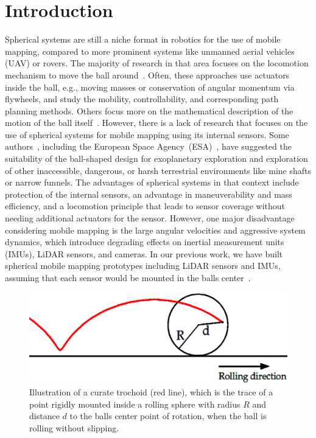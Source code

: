 \section{Introduction}
\label{sec:intro}
Spherical systems are still a niche format in robotics for the use of mobile mapping, compared to more prominent systems like unmanned aerial vehicles (UAV) or rovers.
The majority of research in that area focuses on the locomotion mechanism to move the ball around~\cite{Chen2013, Ylikorpi2007, Chase2012, Joshi2010, Anwar2014}.
Often, these approaches use actuators inside the ball, e.g., moving masses or conservation of angular momentum via flywheels, and study the mobility, controllability, and corresponding path planning methods.
Others focus more on the mathematical description of the motion of the ball itself~\cite{Hogan2015Modeling, Mamaev2020Dynamics, Burkhardt2016Reduced, omark2020, fiori2024lie}. 
However, there is a lack of research that focuses on the use of spherical systems for mobile mapping using its internal sensors.
Some authors~\cite{s22041413, Li2023Special, Bruhn2008A}, including the European Space Agency~(ESA)~\cite{ESA}, have suggested the suitability of the ball-shaped design for exoplanetary exploration and exploration of other inaccessible, dangerous, or harsh terrestrial environments like mine shafts or narrow funnels.
The advantages of spherical systems in that context include protection of the internal sensors, an advantage in maneuverability and mass efficiency, and a locomotion principle that leads to sensor coverage without needing additional actuators for the sensor.
However, one major disadvantage considering mobile mapping is the large angular velocities and aggressive system dynamics, which introduce degrading effects on inertial measurement units (IMUs), LiDAR sensors, and cameras.
In our previous work, we have built spherical mobile mapping prototypes including LiDAR sensors and IMUs, assuming that each sensor would be mounted in the balls center~\cite{9591183, ARZBERGER2021100004, 10256359}.
\begin{figure}
  \centering
  \includegraphics[width=\linewidth]{img/trochoidanim}
  \caption{Illustration of a curate trochoid (red line), which is the trace of a point rigidly mounted inside a rolling sphere with radius $R$ and distance $d$ to the balls center point of rotation, when the ball is rolling without slipping.}
  \label{fig:trochoidanim}
\end{figure}

